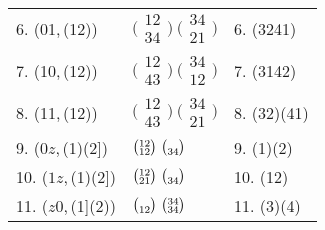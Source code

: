 \documentclass{surv-l}
\numberwithin{equation}{section}
\numberwithin{table}{section}
\numberwithin{figure}{section}
\theoremstyle{definition}
\begin{document}
\begin{table}
{\begin{tabular}{@{}|l|l|l|@{}}
6. (01,\,(12)) &$\big(\!\begin{smallmatrix}12 \\ 34\end{smallmatrix}\!\big)\ \big(\!\begin{smallmatrix}34 \\ 21\end{smallmatrix}\!\big)$ &6. (3241) \\[3pt]
7. (10,\,(12)) &$\big(\!\begin{smallmatrix}12 \\ 43\end{smallmatrix}\!\big)\ \big(\!\begin{smallmatrix}34 \\ 12\end{smallmatrix}\!\big)$ &7. (3142) \\[3pt]
8. (11,\,(12)) &$\big(\!\begin{smallmatrix}12 \\ 43\end{smallmatrix}\!\big)\ \big(\!\begin{smallmatrix}34 \\ 21\end{smallmatrix}\!\big)$ &8. (32)(41) \\[3pt]
\hline
9. ($0z$,\,(1)(2]) &$\big(\!\begin{smallmatrix}12 \\ 12\end{smallmatrix}\!\big)\ \big(\!\begin{smallmatrix}\vphantom{34}\\ 34\end{smallmatrix}\!\big)$ &9. (1)(2) \\[3pt]
10. ($1z$,\,(1)(2]) &$\big(\!\begin{smallmatrix}12 \\ 21\end{smallmatrix}\!\big)\ \big(\!\begin{smallmatrix}\vphantom{34}\\ 34\end{smallmatrix}\!\big)$ &10. (12) \\[3pt]
11. ($z0$,\,(1](2)) &$\big(\!\begin{smallmatrix}\vphantom{34}\\ 12\end{smallmatrix}\!\big)\ \big(\!\begin{smallmatrix}34 \\ 34\end{smallmatrix}\!\big)$ &11. (3)(4) \\[3pt]

\end{tabular}}
\end{table}
\end{document}
